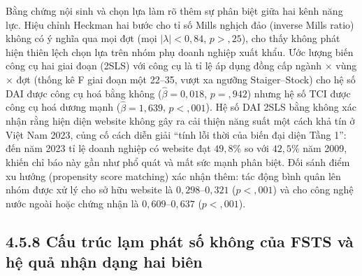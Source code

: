 \documentclass[
  a4paper,
  13pt]{extreport}
\begin{document}
Bằng chứng nội sinh và chọn lựa làm rõ thêm sự phân biệt giữa hai kênh
năng lực. Hiệu chỉnh Heckman hai bước cho tỉ số Mills nghịch đảo
(inverse Mills ratio) không có ý nghĩa qua mọi đợt (mọi
\(|\lambda| < 0{,}84\), \(p > {,}25\)), cho thấy không phát hiện thiên
lệch chọn lựa trên nhóm phụ doanh nghiệp xuất khẩu. Ước lượng biến công
cụ hai giai đoạn (2SLS) với công cụ là tỉ lệ áp dụng đồng cấp ngành ×
vùng × đợt (thống kê F giai đoạn một 22--35, vượt xa ngưỡng
Staiger--Stock) cho hệ số DAI được công cụ hoá bằng không
(\(\hat{\beta} = 0{,}018\), \(p = {,}942\)) nhưng hệ số TCI được công cụ
hoá dương mạnh (\(\hat{\beta} = 1{,}639\), \(p < {,}001\)). Hệ số DAI
2SLS bằng không xác nhận rằng hiện diện website không gây ra cải thiện
năng suất một cách khả tín ở Việt Nam 2023, củng cố cách diễn giải
``tính lỗi thời của biến đại diện Tầng 1'': đến năm 2023 tỉ lệ doanh
nghiệp có website đạt \(49{,}8\%\) so với \(42{,}5\%\) năm 2009, khiến
chỉ báo này gần như phổ quát và mất sức mạnh phân biệt. Đối sánh điểm xu
hướng (propensity score matching) xác nhận thêm: tác động bình quân lên
nhóm được xử lý cho sở hữu website là \(0{,}298\)--\(0{,}321\)
(\(p < {,}001\)) và cho công nghệ nước ngoài hoặc chứng nhận là
\(0{,}609\)--\(0{,}637\) (\(p < {,}001\)).

\hypertarget{cux1ea5u-truxfac-lux1ea1m-phuxe1t-sux1ed1-khuxf4ng-cux1ee7a-fsts-vuxe0-hux1ec7-quux1ea3-nhux1eadn-dux1ea1ng-hai-biuxean}{%
\subsection{4.5.8 Cấu trúc lạm phát số không của FSTS và hệ quả nhận
dạng hai
biên}\label{cux1ea5u-truxfac-lux1ea1m-phuxe1t-sux1ed1-khuxf4ng-cux1ee7a-fsts-vuxe0-hux1ec7-quux1ea3-nhux1eadn-dux1ea1ng-hai-biuxean}}
\end{document}
